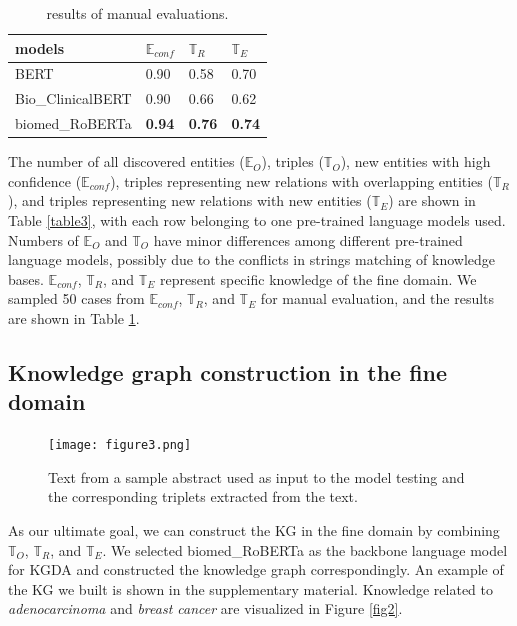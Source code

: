 \documentclass[sigconf]{acmart}
\begin{document}
\begin{table}[h]
	\centering
	\begin{tabular}{llll}
		\hline
		models            & $\mathbb{E}_{conf}$ & $\mathbb{T}_R$ & $\mathbb{T}_E$ \\ \hline
		BERT              & 0.90           & 0.58          & 0.70          \\
            Bio\_ClinicalBERT & 0.90           & 0.66          & 0.62          \\
            biomed\_RoBERTa   & \textbf{0.94}  & \textbf{0.76} & \textbf{0.74} \\ \hline
	\end{tabular}
	\caption{results of manual evaluations.}
	\label{table4}
\end{table}

The number of all discovered entities ($\mathbb{E}_{O}$), triples ($\mathbb{T}_{O}$), new entities with high confidence ($\mathbb{E}_{conf}$), triples representing new relations with overlapping entities ($\mathbb{T}_R$), and triples representing new relations with new entities ($\mathbb{T}_E$) are shown in Table \ref{table3}, with each row belonging to one pre-trained language models used. Numbers of $\mathbb{E}_{O}$ and $\mathbb{T}_{O}$ have minor differences among different pre-trained language models, possibly due to the conflicts in strings matching of knowledge bases. $\mathbb{E}_{conf}$, $\mathbb{T}_R$, and  $\mathbb{T}_E$ represent specific knowledge of the fine domain. We sampled 50 cases from $\mathbb{E}_{conf}$, $\mathbb{T}_R$, and  $\mathbb{T}_E$ for manual evaluation, and the results are shown in Table \ref{table4}.

\subsection{Knowledge graph construction in the fine domain}



\begin{figure}[t]
	\centering
	\texttt{[image: figure3.png]} %
	\caption{Text from a sample abstract used as input to the model testing and the corresponding triplets extracted from the text.}
	\label{fig3}
\end{figure}

As our ultimate goal, we can construct the KG in the fine domain by combining $\mathbb{T}_{O}$, $\mathbb{T}_R$, and $\mathbb{T}_E$. We selected biomed\_RoBERTa as the backbone language model for KGDA and constructed the knowledge graph correspondingly.  An example of the KG we built is shown in the supplementary material.
Knowledge related to \textit{adenocarcinoma} and \textit{breast cancer} are visualized in Figure \ref{fig2}.
\end{document}
